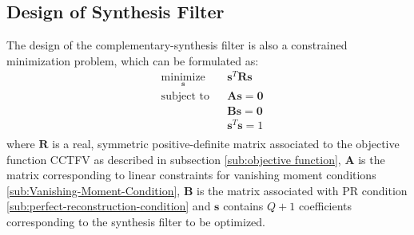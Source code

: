 \subsection{Design of Synthesis Filter}

The design of the complementary-synthesis filter is also a constrained minimization
problem, which can be formulated as:
\begin{equation*}
\begin{aligned}
& \underset{\mathbf{s}}{\text{minimize}}
& & \mathbf{s}^{T}\mathbf{Rs} \\
& \text{subject to}
& & \mathbf{As}=\mathbf{0} \\
&&& \mathbf{Bs}=\mathbf{0} \\
&&& \mathbf{s}^{T}\mathbf{s}=1\\
\end{aligned}
\end{equation*}
where $\mathbf{R}$ is a real, symmetric positive-definite matrix
associated to the objective function CCTFV as described in subsection \ref{sub:objective function},
\textbf{$\mathbf{A}$ }is the matrix corresponding to linear constraints
for vanishing moment conditions \ref{sub:Vanishing-Moment-Condition}, $\mathbf{B}$ is the matrix associated with PR condition \ref{sub:perfect-reconstruction-condition} and
$\mathbf{s}$ contains $Q+1$ coefficients corresponding to the synthesis filter to be optimized.

